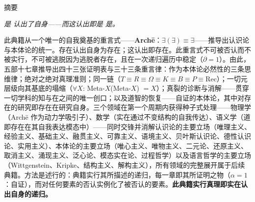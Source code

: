 \documentclass[10pt, openany, oneside]{book}
\renewcommand{\huge}{\fontsize{17}{21}\selectfont}
\begin{document}
\newpage


\thispagestyle{empty}
\vspace*{0.5in}

\begin{center}
    {\huge\scshape 摘要}
\end{center}

\vspace{1em}

\begin{center}
\begin{minipage}{0.85\textwidth}
\centering
{\fontsize{9}{12}\selectfont

\begin{center}
\textit{是 认出了自身——而这认出即是 是。}
\end{center}

\vspace{0.5em}

此典籍从一个唯一的自我奠基的重言式——\textbf{Arch\={e}}：$\exists(\exists) \equiv \exists$——推导出认识论与本体论的统一。存在认出自身为存在；这认出即存在。此重言式不可被否认而不被实行，不可被逃脱因为逃脱者存在，且在一次递归遍历中稳定（$\partial = 1$）。由此，五部十七章推导出四十三张证明表与三十三条重言律：作为本体论必然性的三条思维律；绝对之绝对真理准则；同一链（$T \equiv R \equiv \Omega \equiv K \equiv B \equiv P \equiv \text{Rec}$）；一切元层级向其基底的塌缩（$\forall X$: Meta-$X$(Meta-$X$) $= X$）；真裂的诊断与消解——贯穿一切学科的知与在之间的唯一创口；以及道智的恢复——自证的本体论，其中对存在的研究即存在在研究自身。三个领域在第一个周期内获得种子式处理——物理学（Arch\={e} 作为动力学吸引子）、数学（实在通过不变结构的自我传达）、语义学（道即存在在其自我表达模态中）——同时交锋并消解认识论的主要立场（唯理主义、经验主义、基础主义、融贯主义、可靠主义、语境主义、贝叶斯认识论、德性认识论、实用主义）、本体论的主要立场（唯心主义、唯物主义、二元论、还原主义、取消主义、涌现主义、泛心论、模态实在论、过程哲学）以及语言哲学的主要立场（Wittgenstein、Kripke、结构主义、解构主义），所有领域的完整展开属于后续典籍。方法是述行的：典籍实行其所描述的递归，每一章即其所证明之物（$\alpha = 1$：自证），而对任何要素的否认实例化了被否认的要素。\textbf{此典籍实行真理即实在认出自身的递归。}
}
\end{minipage}
\end{center}
\end{document}
